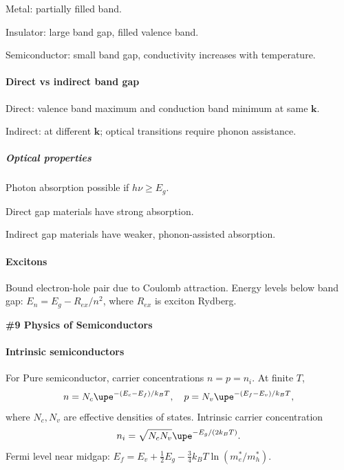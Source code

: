 \begin{enumext}
  \item Metal: partially filled band.
  \item Insulator: large band gap, filled valence band.
  \item Semiconductor: small band gap, conductivity increases with temperature.
\end{enumext}

\paragraph{Direct vs indirect band gap}

\begin{enumext}
  \item Direct: valence band maximum and conduction band minimum at
  same $\bm k$.
  \item Indirect: at different $\bm k$; optical transitions require
  phonon assistance.
\end{enumext}

\subparagraph{Optical properties}

Photon absorption possible if $h\nu \ge E_g$.
\begin{enumext}
  \item Direct gap materials have strong absorption.
  \item Indirect gap materials have weaker, phonon-assisted absorption.
\end{enumext}

\paragraph{Excitons}

Bound electron-hole pair due to Coulomb attraction. Energy levels below band
gap: $E_n = E_g - R_{ex}/n^2$, where $R_{ex}$ is exciton Rydberg.

\begin{framed}\large\bfseries
  \#9 Physics of Semiconductors
\end{framed}

\paragraph{Intrinsic semiconductors}

For Pure semiconductor, carrier concentrations $n = p = n_i$.
At finite $T$,
\[
  n = N_c \upe^{-(E_c - E_f)/k_B T}, \quad p = N_v \upe^{-(E_f - E_v)/k_B T},
\]
where $N_c, N_v$ are effective densities of states.
Intrinsic carrier concentration
\[
  n_i = \sqrt{N_c N_v} \upe^{-E_g/(2k_B T)}.
\]
Fermi level near midgap:
$E_f = E_v + \frac{1}{2}E_g - \frac{3}{4}k_B T \ln(m_e^*/m_h^*)$.

